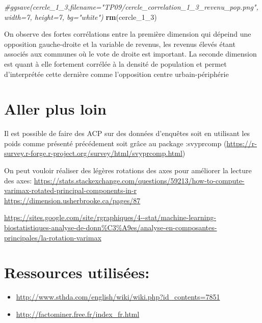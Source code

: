 \documentclass[
]{book}
\newenvironment{Shaded}{\begin{snugshade}}{\end{snugshade}}
\newcommand{\CommentTok}[1]{\textcolor[rgb]{0.56,0.35,0.01}{\textit{#1}}}
\newcommand{\FunctionTok}[1]{\textcolor[rgb]{0.13,0.29,0.53}{\textbf{#1}}}
\newcommand{\NormalTok}[1]{#1}
\begin{document}
\begin{Shaded}
\begin{Highlighting}[]
\CommentTok{\#ggsave(cercle\_1\_3,filename="TP09/cercle\_correlation\_1\_3\_revenu\_pop.png", width=7, height=7, bg="white")}
\FunctionTok{rm}\NormalTok{(cercle\_1\_3)}
\end{Highlighting}
\end{Shaded}

On observe des fortes corrélations entre la première dimension qui dépeind une opposition gauche-droite et la variable de revenus, les revenus élevés étant associés aux communes où le vote de droite est important. La seconde dimension est quant à elle fortement corrélée à la densité de population et permet d'interprétée cette dernière comme l'opposition centre urbain-périphérie

\hypertarget{aller-plus-loin}{%
\section{Aller plus loin}\label{aller-plus-loin}}

Il est possible de faire des ACP sur des données d'enquêtes soit en utilisant les poids comme présenté précédement soit grâce au package :svyprcomp (\url{https://r-survey.r-forge.r-project.org/survey/html/svyprcomp.html})

On peut vouloir réaliser des légères rotations des axes pour améliorer la lecture des axes: \href{https://stats.stackexchange.com/questions/59213/how-to-compute-varimax-rotated-principal-components-in-r\%20https://dimension.usherbrooke.ca/pages/87}{https://stats.stackexchange.com/questions/59213/how-to-compute-varimax-rotated-principal-components-in-r https://dimension.usherbrooke.ca/pages/87}

\url{https://sites.google.com/site/rgraphiques/4--stat/machine-learning-biostatistiques-analyse-de-donn\%C3\%A9es/analyse-en-composantes-principales/la-rotation-varimax}

\hypertarget{ressources-utilisuxe9es}{%
\section{Ressources utilisées:}\label{ressources-utilisuxe9es}}

\begin{itemize}
\item
  \url{http://www.sthda.com/english/wiki/wiki.php?id_contents=7851}
\item
  \url{http://factominer.free.fr/index_fr.html}
\end{itemize}
\end{document}
